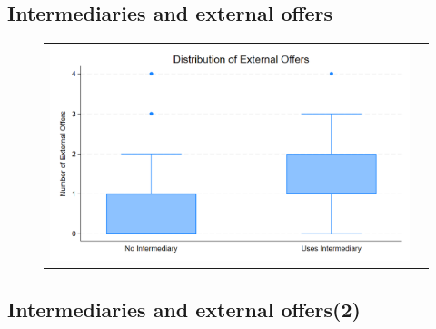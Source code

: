 \documentclass[12pt]{article}
\begin{document}



\newpage

\subsection{Intermediaries and external offers}



\begin{figure}[H]
\caption{}
 \label{fig:ie4_6and7}
\centering{}%
\begin{tabular}{cc}
\includegraphics[scale=0.27]{figures/IE4/IE4_intermediary_search_box.png} 
\end{tabular}
\end{figure}




\newpage

\subsection{Intermediaries and external offers(2)}





 

 
\end{document}
